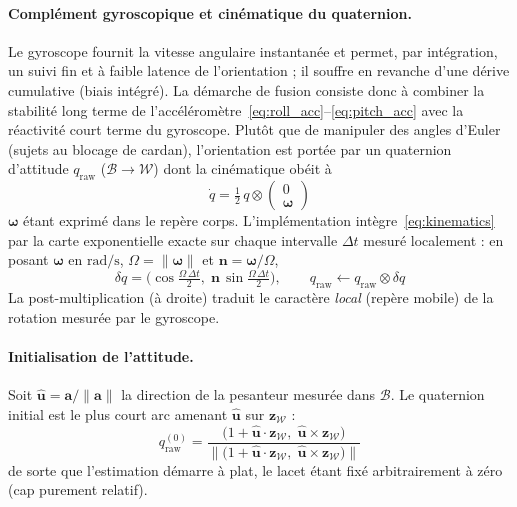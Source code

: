 \documentclass{tropLaClasse}
\begin{document}
\paragraph{Complément gyroscopique et cinématique du quaternion.}
Le gyroscope fournit la vitesse angulaire instantanée et permet, par intégration, un suivi fin et à faible latence de l'orientation ; il souffre en revanche d'une dérive cumulative (biais intégré). La démarche de fusion consiste donc à combiner la stabilité long terme de l'accéléromètre~\eqref{eq:roll_acc}--\eqref{eq:pitch_acc} avec la réactivité court terme du gyroscope. Plutôt que de manipuler des angles d'Euler (sujets au blocage de cardan), l'orientation est portée par un quaternion d'attitude $q_{\text{raw}}$ ($\mathcal B\rightarrow\mathcal W$) dont la cinématique obéit à
\begin{equation}
\dot{q}=\tfrac{1}{2}\,q\otimes
\begin{pmatrix}0\\ \boldsymbol{\omega}\end{pmatrix}
\label{eq:kinematics}
\end{equation}
$\boldsymbol{\omega}$ étant exprimé dans le repère corps. L'implémentation intègre~\eqref{eq:kinematics} par la carte exponentielle exacte sur chaque intervalle $\Delta t$ mesuré localement : en posant $\boldsymbol{\omega}$ en $\mathrm{rad/s}$, $\Omega=\lVert\boldsymbol{\omega}\rVert$ et $\mathbf{n}=\boldsymbol{\omega}/\Omega$,
\begin{equation}
\delta q=\Big(\cos\tfrac{\Omega\,\Delta t}{2},\;\mathbf{n}\,\sin\tfrac{\Omega\,\Delta t}{2}\Big),
\qquad
q_{\text{raw}}\leftarrow q_{\text{raw}}\otimes\delta q 
\label{eq:gyro_step}
\end{equation}
La post-multiplication (à droite) traduit le caractère \emph{local} (repère mobile) de la rotation mesurée par le gyroscope.

\paragraph{Initialisation de l'attitude.}
Soit $\hat{\mathbf{u}}=\mathbf{a}/\lVert\mathbf{a}\rVert$ la direction de la pesanteur mesurée dans $\mathcal B$. Le quaternion initial est le plus court arc amenant $\hat{\mathbf{u}}$ sur $\mathbf{z}_{\mathcal W}$ :
\begin{equation}
q_{\text{raw}}^{(0)}=\frac{\big(1+\hat{\mathbf{u}}\cdot\mathbf{z}_{\mathcal W},\;\hat{\mathbf{u}}\times\mathbf{z}_{\mathcal W}\big)}{\big\lVert\big(1+\hat{\mathbf{u}}\cdot\mathbf{z}_{\mathcal W},\;\hat{\mathbf{u}}\times\mathbf{z}_{\mathcal W}\big)\big\rVert}
\label{eq:seed}
\end{equation}
de sorte que l'estimation démarre à plat, le lacet étant fixé arbitrairement à zéro (cap purement relatif).
\end{document}
